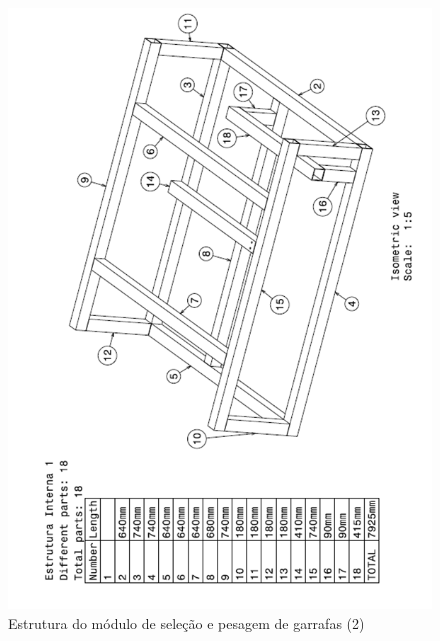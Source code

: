 \begin{anexosenv}
\begin{figure}[!ht]
	\centering
		\includegraphics[scale=0.6]{figuras/estrutura/anexos/1(2).png}
	\caption{Estrutura do módulo de seleção e pesagem de garrafas (2)}
\end{figure}


\end{anexosenv}
